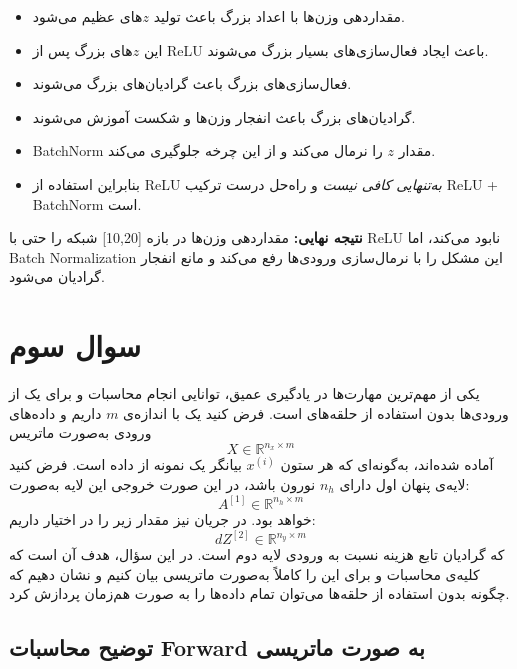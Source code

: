 \documentclass{article}
\begin{document}
\begin{itemize}
	\item مقداردهی وزن‌ها با اعداد بزرگ باعث تولید $z$های عظیم می‌شود.
	\item این $z$های بزرگ پس از ReLU باعث ایجاد فعال‌سازی‌های بسیار بزرگ می‌شوند.
	\item فعال‌سازی‌های بزرگ باعث گرادیان‌های بزرگ می‌شوند.
	\item گرادیان‌های بزرگ باعث انفجار وزن‌ها و شکست آموزش می‌شوند.
	\item BatchNorm مقدار $z$ را نرمال می‌کند و از این چرخه جلوگیری می‌کند.
	\item بنابراین استفاده از ReLU \emph{به‌تنهایی کافی نیست} و راه‌حل درست ترکیب ReLU + BatchNorm است.
\end{itemize}

\textbf{نتیجه نهایی:}  
مقداردهی وزن‌ها در بازه [10,20] شبکه را حتی با ReLU نابود می‌کند،  
اما Batch Normalization این مشکل را با نرمال‌سازی ورودی‌ها رفع می‌کند و مانع انفجار گرادیان می‌شود.



\section{سوال سوم}

یکی از مهم‌ترین مهارت‌ها در یادگیری عمیق، توانایی انجام محاسبات  و  برای یک  از ورودی‌ها بدون استفاده از حلقه‌های  است.  
فرض کنید یک  با اندازه‌ی \( m \) داریم و داده‌های ورودی به‌صورت ماتریس
\[
X \in \mathbb{R}^{n_x \times m}
\]
آماده شده‌اند، به‌گونه‌ای که هر ستون \( x^{(i)} \) بیانگر یک نمونه از داده است.  
فرض کنید لایه‌ی پنهان اول دارای \( n_h \) نورون باشد، در این صورت خروجی این لایه به‌صورت:
\[
A^{[1]} \in \mathbb{R}^{n_h \times m}
\]
خواهد بود.  
در جریان  نیز مقدار زیر را در اختیار داریم:
\[
dZ^{[2]} \in \mathbb{R}^{n_y \times m}
\]
که گرادیان تابع هزینه نسبت به ورودی لایه دوم است.  
در این سؤال، هدف آن است که کلیه‌ی محاسبات  و  برای این  را کاملاً به‌صورت ماتریسی بیان کنیم و نشان دهیم که چگونه بدون استفاده از حلقه‌ها می‌توان تمام داده‌ها را به صورت هم‌زمان پردازش کرد.


\subsection{توضیح محاسبات Forward به صورت ماتریسی}
\end{document}

